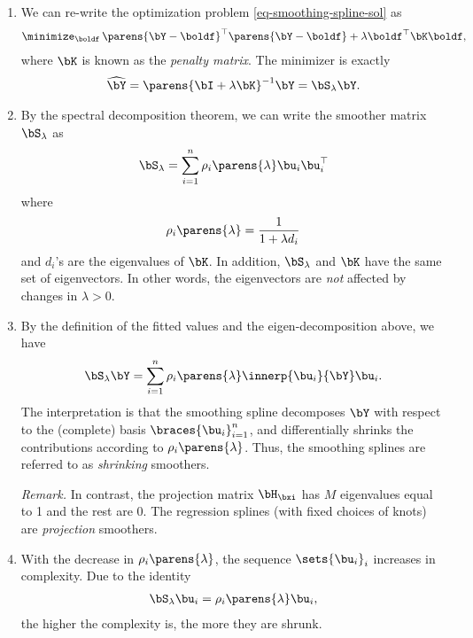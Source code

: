 \documentclass[12pt]{article}
\begin{document}
\begin{enumerate}[label=\textbf{\arabic*.}]
\begin{enumerate}
		\item We can re-write the optimization problem \eqref{eq-smoothing-spline-sol} as 
		\begin{align*}
			\minimize_{\boldf} \, \parens{\bY - \boldf}^\top \parens{\bY - \boldf} + \lambda \boldf^\top \bK \boldf, 
		\end{align*}
		where $\bK$ is known as the \emph{penalty matrix}. The minimizer is exactly 
		\begin{align*}
			\widehat{\bY} = \parens{\bI + \lambda \bK}^{-1} \bY = \bS_{\lambda} \bY. 
		\end{align*}
		
		\item By the spectral decomposition theorem, we can write the smoother matrix $\bS_\lambda$ as 
		\begin{align*}
			\bS_\lambda = \sum_{i = 1}^n \rho_i \parens{\lambda} \bu_i \bu_i^\top
		\end{align*}
		where
		\begin{align*}
			\rho_i \parens{\lambda} = \frac{1}{1 + \lambda d_i}
		\end{align*}
		and $d_i$'s are the eigenvalues of $\bK$. In addition, $\bS_\lambda$ and $\bK$ have the same set of eigenvectors. In other words, the eigenvectors are \emph{not} affected by changes in $\lambda > 0$. 
		
		\item By the definition of the fitted values and the eigen-decomposition above, we have 
		\begin{align*}
			\bS_\lambda \bY = \sum_{i=1}^n \rho_i \parens{\lambda} \innerp{\bu_i}{\bY} \bu_i. 
		\end{align*}
		The interpretation is that the smoothing spline decomposes $\bY$ with respect to the (complete) basis $\braces{ \bu_i }_{i=1}^n$, and differentially shrinks the contributions according to $\rho_i \parens{\lambda}$. Thus, the smoothing splines are referred to as \textit{shrinking} smoothers. 
		
		\textit{Remark.} In contrast, the projection matrix $\bH_{\bxi}$ has $M$ eigenvalues equal to 1 and the rest are 0. The regression splines (with fixed choices of knots) are \textit{projection} smoothers. 
		
		\item With the decrease in $\rho_{i} \parens{\lambda}$, the sequence $\sets{\bu_i}_i$ increases in complexity. Due to the identity 
		\begin{align*}
			\bS_{\lambda} \bu_i = \rho_i \parens{\lambda} \bu_i, 
		\end{align*}
		the higher the complexity is, the more they are shrunk. 
		

\end{enumerate}
\end{enumerate}
\end{document}
